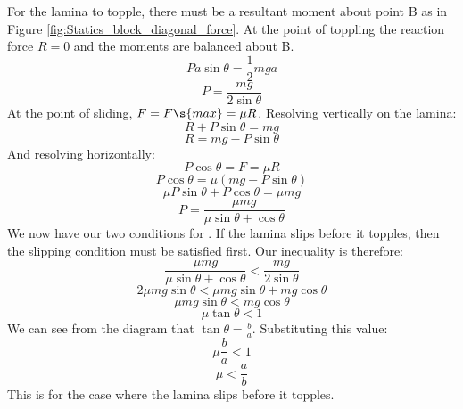 \begin{problem}
{{For the lamina to topple, there must be a resultant moment about point B as in Figure \ref{fig:Statics_block_diagonal_force}. At the point of toppling the reaction force $R = 0$ and the moments are balanced about B.
\begin{equation*}	
Pa\sin{\theta} = \frac{1}{2}mga	
\end{equation*}
\begin{equation*}	
P = \frac{mg}{2\sin{\theta}}	
\end{equation*}
At the point of sliding, $F = F\s{max} = \mu R$. Resolving vertically on the lamina:
\begin{equation*}	
R + P\sin{\theta} = mg	
\end{equation*}
\begin{equation}	
R = mg - P\sin{\theta} \label{eq:sliding_reaction_force}	
\end{equation}
And resolving horizontally:
\begin{equation*}	
P\cos{\theta} = F = \mu R 	
\end{equation*}
\begin{equation*}	
P\cos{\theta} = \mu\left(mg - P\sin{\theta}\right)	
\end{equation*}
\begin{equation*}	
\mu P\sin{\theta} + P\cos{\theta} = \mu mg	
\end{equation*}
\begin{equation*}	
P = \frac{\mu mg}{\mu\sin{\theta} + \cos{\theta}}	
\end{equation*}
We now have our two conditions for . If the lamina slips before it topples, then the slipping condition must be satisfied first. Our inequality is therefore:
\begin{equation*}  
\frac{\mu mg}{\mu\sin{\theta} + \cos{\theta}} < \frac{mg}{2\sin{\theta}}	
\end{equation*}
\begin{equation*} 
2\mu mg\sin{\theta} < \mu mg\sin{\theta} + mg\cos{\theta}	
\end{equation*}
\begin{equation*}	
\mu mg\sin{\theta} < mg\cos{\theta}	
\end{equation*}
\begin{equation*} 	
\mu\tan{\theta} < 1	
\end{equation*}
We can see from the diagram that $\tan{\theta} = \frac{b}{a}$. Substituting this value:
\begin{equation*}	
\mu\frac{b}{a} < 1	
\end{equation*}
\begin{equation*}	
\mu < \frac{a}{b}	
\end{equation*}
This is for the case where the lamina slips before it topples.

}}
\end{problem}
